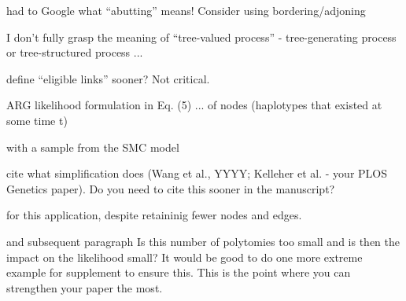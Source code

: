 \reply{
}

\begin{point}{\revref} %
 had to Google what ``abutting'' means! Consider using bordering/adjoning
\end{point}

\reply{
}

\begin{point}{\revref} %
 I don't fully grasp the meaning of ``tree-valued process'' - tree-generating process or tree-structured process ...
\end{point}

\reply{
}


\begin{point}{\revref} %
 define ``eligible links'' sooner? Not critical.
\end{point}

\reply{
}

\begin{point}{\revref} %
 ARG likelihood formulation in Eq. (5) ... of nodes (haplotypes that existed at some time t)
\end{point}

\reply{
}

\begin{point}{\revref} %
 with a sample from the SMC model
\end{point}

\reply{
}

\begin{point}{\revref} %
 cite what simplification does (Wang et al., YYYY; Kelleher et al. - your PLOS Genetics paper). Do you need to cite this sooner in the manuscript?
\end{point}

\reply{
}

\begin{point}{\revref} %
 for this application, despite retaininig fewer nodes and edges.
\end{point}

\reply{
}

\begin{point}{\revref{} and subsequent paragraph} %
 Is this number of polytomies too small and is then the impact on the likelihood small? It would be good to do one more extreme example for supplement to ensure this. This is the point where you can strengthen your paper the most.
\end{point}

